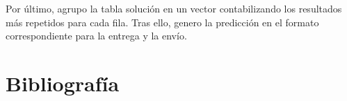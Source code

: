 Por último, agrupo la tabla solución en un vector contabilizando los resultados más repetidos para cada fila. Tras ello, genero la predicción en el formato correspondiente para la entrega y la envío. 

\newpage
 
\section{Bibliografía}




